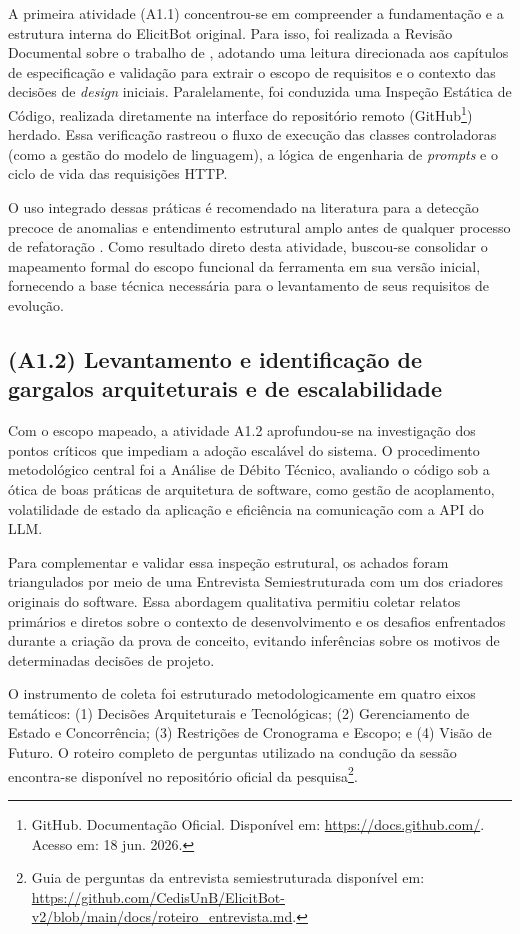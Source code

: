 A primeira atividade (A1.1) concentrou-se em compreender a fundamentação e a estrutura interna do ElicitBot original. Para isso, foi realizada a Revisão Documental sobre o trabalho de , adotando uma leitura direcionada aos capítulos de especificação e validação para extrair o escopo de requisitos e o contexto das decisões de \textit{design} iniciais. Paralelamente, foi conduzida uma Inspeção Estática de Código, realizada diretamente na interface do repositório remoto (GitHub\footnote{GitHub. Documentação Oficial. Disponível em: \url{https://docs.github.com/}. Acesso em: 18 jun. 2026.}) herdado. Essa verificação rastreou o fluxo de execução das classes controladoras (como a gestão do modelo de linguagem), a lógica de engenharia de \textit{prompts} e o ciclo de vida das requisições HTTP.

O uso integrado dessas práticas é recomendado na literatura para a detecção precoce de anomalias e entendimento estrutural amplo antes de qualquer processo de refatoração \cite{sommerville2016}. Como resultado direto desta atividade, buscou-se consolidar o mapeamento formal do escopo funcional da ferramenta em sua versão inicial, fornecendo a base técnica necessária para o levantamento de seus requisitos de evolução.

\subsection{(A1.2) Levantamento e identificação de gargalos arquiteturais e de escalabilidade}

Com o escopo mapeado, a atividade A1.2 aprofundou-se na investigação dos pontos críticos que impediam a adoção escalável do sistema. O procedimento metodológico central foi a Análise de Débito Técnico, avaliando o código sob a ótica de boas práticas de arquitetura de software, como gestão de acoplamento, volatilidade de estado da aplicação e eficiência na comunicação com a API do LLM.

Para complementar e validar essa inspeção estrutural, os achados foram triangulados por meio de uma Entrevista Semiestruturada com um dos criadores originais do software. Essa abordagem qualitativa permitiu coletar relatos primários e diretos sobre o contexto de desenvolvimento e os desafios enfrentados durante a criação da prova de conceito, evitando inferências sobre os motivos de determinadas decisões de projeto.

O instrumento de coleta foi estruturado metodologicamente em quatro eixos temáticos: (1) Decisões Arquiteturais e Tecnológicas; (2) Gerenciamento de Estado e Concorrência; (3) Restrições de Cronograma e Escopo; e (4) Visão de Futuro. O roteiro completo de perguntas utilizado na condução da sessão encontra-se disponível no repositório oficial da pesquisa\footnote{Guia de perguntas da entrevista semiestruturada disponível em: \url{https://github.com/CedisUnB/ElicitBot-v2/blob/main/docs/roteiro_entrevista.md}.}.

